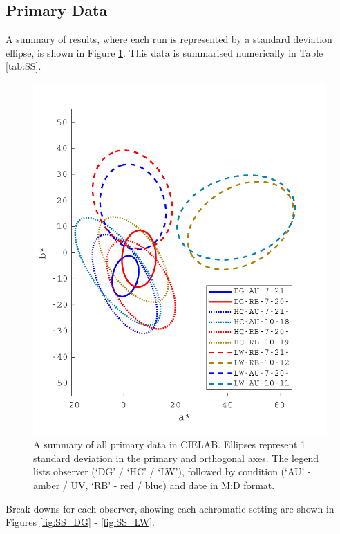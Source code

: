 \subsection{Primary Data}

A summary of results, where each run is represented by a standard deviation ellipse, is shown in Figure \ref{fig:SSsummary}. This data is summarised numerically in Table \ref{tab:SS}.
%
\begin{figure}[htbp]
\includegraphics[max width=1.2\textwidth,center]{figs/SmallSphere/SSsummary.pdf}
\caption{A summary of all primary data in CIELAB. Ellipses represent 1 standard deviation in the primary and orthogonal axes. The legend lists observer (`DG' / `HC' / `LW'), followed by condition (`AU' - amber / UV, `RB' - red / blue) and date in M:D format.}
\label{fig:SSsummary}
\end{figure}
%
Break downs for each observer, showing each achromatic setting are shown in Figures \ref{fig:SS_DG} - \ref{fig:SS_LW}.


